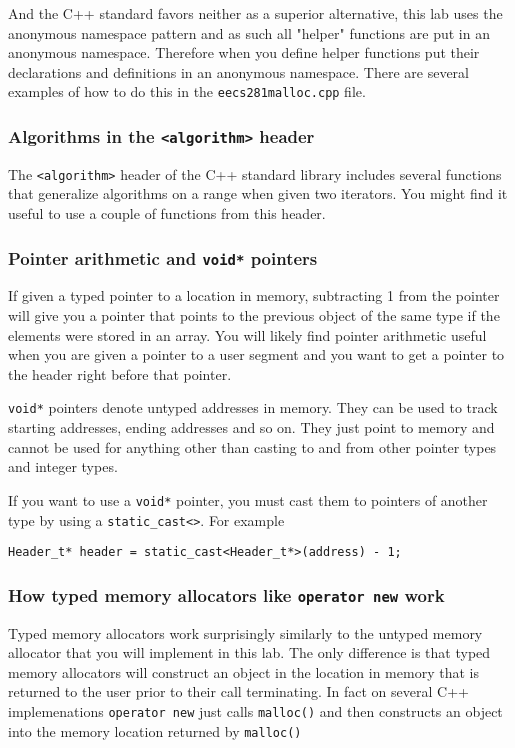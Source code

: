 \documentclass{article}
\begin{document}
And the C++ standard favors neither as a superior alternative, this lab uses
the anonymous namespace pattern and as such all "helper" functions are put in
an anonymous namespace.  Therefore when you define helper functions put their
declarations and definitions in an anonymous namespace.  There are several
examples of how to do this in the \texttt{eecs281malloc.cpp} file.

\subsubsection{Algorithms in the \texttt{<algorithm>} header}
The \texttt{<algorithm>} header of the C++ standard library includes several
functions that generalize algorithms on a range when given two iterators.  You
might find it useful to use a couple of functions from this header.

\subsubsection{Pointer arithmetic and \texttt{void*} pointers}
If given a typed pointer to a location in memory, subtracting 1 from the
pointer will give you a pointer that points to the previous object of the same
type if the elements were stored in an array.  You will likely find pointer
arithmetic useful when you are given a pointer to a user segment and you want
to get a pointer to the header right before that pointer.

\texttt{void*} pointers denote untyped addresses in memory.  They can be used
to track starting addresses, ending addresses and so on.  They just point to
memory and cannot be used for anything other than casting to and from other
pointer types and integer types.

If you want to use a \texttt{void*} pointer, you must cast them to pointers of
another type by using a \texttt{static\_cast<>}.  For example
\begin{lstlisting}
Header_t* header = static_cast<Header_t*>(address) - 1;
\end{lstlisting}

\subsubsection{How typed memory allocators like \texttt{operator new} work}
Typed memory allocators work surprisingly similarly to the untyped memory
allocator that you will implement in this lab.  The only difference is that
typed memory allocators will construct an object in the location in memory
that is returned to the user prior to their call terminating.  In fact on
several C++ implemenations \texttt{operator new} just calls \texttt{malloc()}
and then constructs an object into the memory location returned by
\texttt{malloc()}
\end{document}
